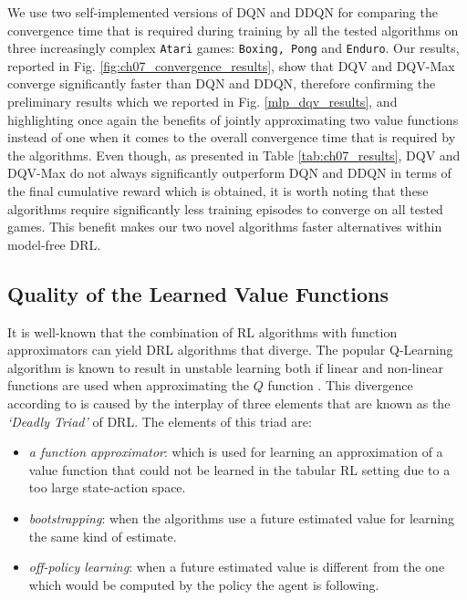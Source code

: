 We use two self-implemented versions of DQN and DDQN for comparing the convergence time that is required during training by all the tested algorithms on three increasingly complex \texttt{Atari} games: \texttt{Boxing, Pong} and \texttt{Enduro}. Our results, reported in Fig. \ref{fig:ch07_convergence_results}, show that DQV and DQV-Max converge significantly faster than DQN and DDQN, therefore confirming the preliminary results which we reported in Fig. \ref{mlp_dqv_results}, and highlighting once again the benefits of jointly approximating two value functions instead of one when it comes to the overall convergence time that is required by the algorithms. Even though, as presented in Table \ref{tab:ch07_results}, DQV and DQV-Max do not always significantly outperform DQN and DDQN in terms of the final cumulative reward which is obtained, it is worth noting that these algorithms require significantly less training episodes to converge on all tested games. This benefit makes our two novel algorithms faster alternatives within model-free DRL.



\subsection{Quality of the Learned Value Functions}
\label{sec:quality_of_value_functions}

It is well-known that the combination of RL algorithms with function approximators can yield DRL algorithms that diverge. The popular Q-Learning algorithm is known to result in unstable learning both if linear \cite{tsitsiklis1997analysis} and non-linear functions are used when approximating the $Q$ function \cite{van2018deep}. This divergence according to \citet{sutton2018reinforcement} is caused by the interplay of three elements that are known as the \textit{`Deadly Triad'} of DRL. The elements of this triad are:
\begin{itemize}
    \item \textit{a function approximator}: which is used for learning an approximation of a value function that could not be learned in the tabular RL setting due to a too large state-action space.
    \item \textit{bootstrapping}: when the algorithms use a future estimated value for learning the same kind of estimate.
    \item \textit{off-policy learning}: when a future estimated value is different from the one which would be computed by the policy the agent is following.
\end{itemize}{}

